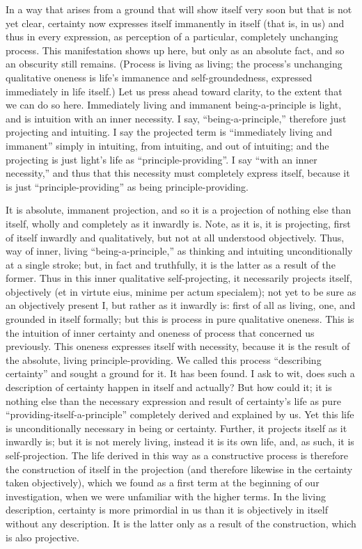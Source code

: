In a way that arises from a ground
that will show itself very soon but
that is not yet clear,
certainty now expresses itself immanently in itself
(that is, in us)
and thus in every expression,
as perception of a particular,
completely unchanging process.
This manifestation shows up here,
but only as an absolute fact,
and so an obscurity still remains.
(Process is living as living;
the process's unchanging qualitative oneness is
life's immanence and self-groundedness,
expressed immediately in life itself.)
Let us press ahead toward clarity,
to the extent that we can do so here.
Immediately living and immanent being-a-principle is light,
and is intuition with an inner necessity.
I say, “being-a-principle,”
therefore just projecting and intuiting.
I say the projected term is “immediately living and immanent”
simply in intuiting, from intuiting, and out of intuiting;
and the projecting is just light's life as “principle-providing”.
I say “with an inner necessity,”
and thus that this necessity must
completely express itself,
because it is just “principle-providing”
as being principle-providing.

It is absolute, immanent projection,
and so it is a projection of nothing else than itself,
wholly and completely as it inwardly is.
Note, as it is, it is projecting,
first of itself inwardly and qualitatively,
but not at all understood objectively.
Thus, way of inner, living “being-a-principle,”
as thinking and intuiting unconditionally at a single stroke;
but, in fact and truthfully, it is the latter as a result of the former.
Thus in this inner qualitative self-projecting,
it necessarily projects itself, objectively
(et in virtute eius, minime per actum specialem);
not yet to be sure as an objectively present I,
but rather as it inwardly is:
first of all as living, one, and grounded in itself formally;
but this is process in pure qualitative oneness.
This is the intuition of inner certainty
and oneness of process that concerned us previously.
This oneness expresses itself with necessity,
because it is the result of
the absolute, living principle-providing.
We called this process “describing certainty”
and sought a ground for it.
It has been found.
I ask to wit, does such a description of certainty
happen in itself and actually?
But how could it; it is nothing else than
the necessary expression and result of certainty's life
as pure “providing-itself-a-principle”
completely derived and explained by us.
Yet this life is unconditionally necessary in being or certainty.
Further, it projects itself as it inwardly is;
but it is not merely living, instead it is its own life,
and, as such, it is self-projection.
The life derived in this way as a constructive process is
therefore the construction of itself in the projection
(and therefore likewise in the certainty taken objectively),
which we found as a first term at the beginning of our investigation,
when we were unfamiliar with the higher terms.
In the living description, certainty is
more primordial in us than it is
objectively in itself without any description.
It is the latter only as
a result of the construction,
which is also projective.

